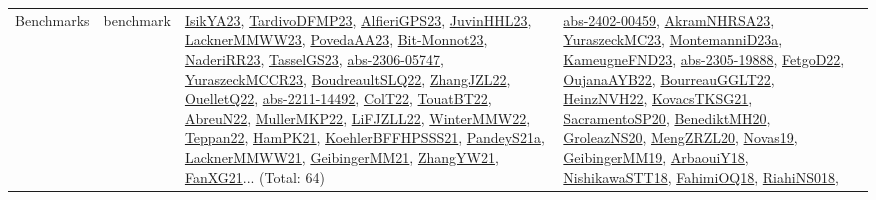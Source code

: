 {\begin{longtable}{lp{3cm}>{\raggedright}p{6cm}>{\raggedright}p{6cm}p{8cm}}
Benchmarks & benchmark & \href{articles/IsikYA23.pdf}{IsikYA23}\cite{IsikYA23}, \href{papers/TardivoDFMP23.pdf}{TardivoDFMP23}\cite{TardivoDFMP23}, \href{articles/AlfieriGPS23.pdf}{AlfieriGPS23}\cite{AlfieriGPS23}, \href{papers/JuvinHHL23.pdf}{JuvinHHL23}\cite{JuvinHHL23}, \href{articles/LacknerMMWW23.pdf}{LacknerMMWW23}\cite{LacknerMMWW23}, \href{papers/PovedaAA23.pdf}{PovedaAA23}\cite{PovedaAA23}, \href{papers/Bit-Monnot23.pdf}{Bit-Monnot23}\cite{Bit-Monnot23}, \href{articles/NaderiRR23.pdf}{NaderiRR23}\cite{NaderiRR23}, \href{papers/TasselGS23.pdf}{TasselGS23}\cite{TasselGS23}, \href{articles/abs-2306-05747.pdf}{abs-2306-05747}\cite{abs-2306-05747}, \href{articles/YuraszeckMCCR23.pdf}{YuraszeckMCCR23}\cite{YuraszeckMCCR23}, \href{papers/BoudreaultSLQ22.pdf}{BoudreaultSLQ22}\cite{BoudreaultSLQ22}, \href{papers/ZhangJZL22.pdf}{ZhangJZL22}\cite{ZhangJZL22}, \href{papers/OuelletQ22.pdf}{OuelletQ22}\cite{OuelletQ22}, \href{articles/abs-2211-14492.pdf}{abs-2211-14492}\cite{abs-2211-14492}, \href{articles/ColT22.pdf}{ColT22}\cite{ColT22}, \href{papers/TouatBT22.pdf}{TouatBT22}\cite{TouatBT22}, \href{articles/AbreuN22.pdf}{AbreuN22}\cite{AbreuN22}, \href{articles/MullerMKP22.pdf}{MullerMKP22}\cite{MullerMKP22}, \href{papers/LiFJZLL22.pdf}{LiFJZLL22}\cite{LiFJZLL22}, \href{papers/WinterMMW22.pdf}{WinterMMW22}\cite{WinterMMW22}, \href{papers/Teppan22.pdf}{Teppan22}\cite{Teppan22}, \href{articles/HamPK21.pdf}{HamPK21}\cite{HamPK21}, \href{articles/KoehlerBFFHPSSS21.pdf}{KoehlerBFFHPSSS21}\cite{KoehlerBFFHPSSS21}, \href{articles/PandeyS21a.pdf}{PandeyS21a}\cite{PandeyS21a}, \href{papers/LacknerMMWW21.pdf}{LacknerMMWW21}\cite{LacknerMMWW21}, \href{papers/GeibingerMM21.pdf}{GeibingerMM21}\cite{GeibingerMM21}, \href{articles/ZhangYW21.pdf}{ZhangYW21}\cite{ZhangYW21}, \href{articles/FanXG21.pdf}{FanXG21}\cite{FanXG21}... (Total: 64) & \href{articles/abs-2402-00459.pdf}{abs-2402-00459}\cite{abs-2402-00459}, \href{articles/AkramNHRSA23.pdf}{AkramNHRSA23}\cite{AkramNHRSA23}, \href{papers/YuraszeckMC23.pdf}{YuraszeckMC23}\cite{YuraszeckMC23}, \href{articles/MontemanniD23a.pdf}{MontemanniD23a}\cite{MontemanniD23a}, \href{papers/KameugneFND23.pdf}{KameugneFND23}\cite{KameugneFND23}, \href{articles/abs-2305-19888.pdf}{abs-2305-19888}\cite{abs-2305-19888}, \href{articles/FetgoD22.pdf}{FetgoD22}\cite{FetgoD22}, \href{papers/OujanaAYB22.pdf}{OujanaAYB22}\cite{OujanaAYB22}, \href{articles/BourreauGGLT22.pdf}{BourreauGGLT22}\cite{BourreauGGLT22}, \href{articles/HeinzNVH22.pdf}{HeinzNVH22}\cite{HeinzNVH22}, \href{papers/KovacsTKSG21.pdf}{KovacsTKSG21}\cite{KovacsTKSG21}, \href{articles/SacramentoSP20.pdf}{SacramentoSP20}\cite{SacramentoSP20}, \href{articles/BenediktMH20.pdf}{BenediktMH20}\cite{BenediktMH20}, \href{papers/GroleazNS20.pdf}{GroleazNS20}\cite{GroleazNS20}, \href{articles/MengZRZL20.pdf}{MengZRZL20}\cite{MengZRZL20}, \href{articles/Novas19.pdf}{Novas19}\cite{Novas19}, \href{papers/GeibingerMM19.pdf}{GeibingerMM19}\cite{GeibingerMM19}, \href{papers/ArbaouiY18.pdf}{ArbaouiY18}\cite{ArbaouiY18}, \href{papers/NishikawaSTT18.pdf}{NishikawaSTT18}\cite{NishikawaSTT18}, \href{articles/FahimiOQ18.pdf}{FahimiOQ18}\cite{FahimiOQ18}, \href{papers/RiahiNS018.pdf}{RiahiNS018}\cite{RiahiNS018}, 
\end{longtable}}
